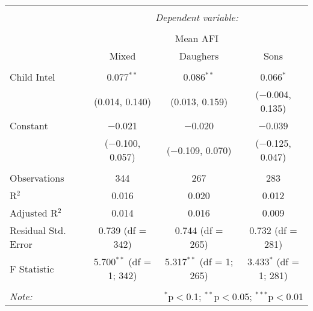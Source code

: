
\begingroup 
\small 
\begin{tabular}{@{\extracolsep{1pt}}lccc} 
\\[-1.8ex]\hline 
\hline \\[-1.8ex] 
 & \multicolumn{3}{c}{\textit{Dependent variable:}} \\ 
\cline{2-4} 
\\[-1.8ex] & \multicolumn{3}{c}{Mean AFI} \\ 
 & Mixed & Daughers & Sons \\ 
\hline \\[-1.8ex] 
 Child Intel & 0.077$^{**}$ & 0.086$^{**}$ & 0.066$^{*}$ \\ 
  & (0.014, 0.140) & (0.013, 0.159) & ($-$0.004, 0.135) \\ 
  Constant & $-$0.021 & $-$0.020 & $-$0.039 \\ 
  & ($-$0.100, 0.057) & ($-$0.109, 0.070) & ($-$0.125, 0.047) \\ 
 \hline \\[-1.8ex] 
Observations & 344 & 267 & 283 \\ 
R$^{2}$ & 0.016 & 0.020 & 0.012 \\ 
Adjusted R$^{2}$ & 0.014 & 0.016 & 0.009 \\ 
Residual Std. Error & 0.739 (df = 342) & 0.744 (df = 265) & 0.732 (df = 281) \\ 
F Statistic & 5.700$^{**}$ (df = 1; 342) & 5.317$^{**}$ (df = 1; 265) & 3.433$^{*}$ (df = 1; 281) \\ 
\hline 
\hline \\[-1.8ex] 
\textit{Note:}  & \multicolumn{3}{r}{$^{*}$p$<$0.1; $^{**}$p$<$0.05; $^{***}$p$<$0.01} \\ 
\end{tabular} 
\endgroup 
